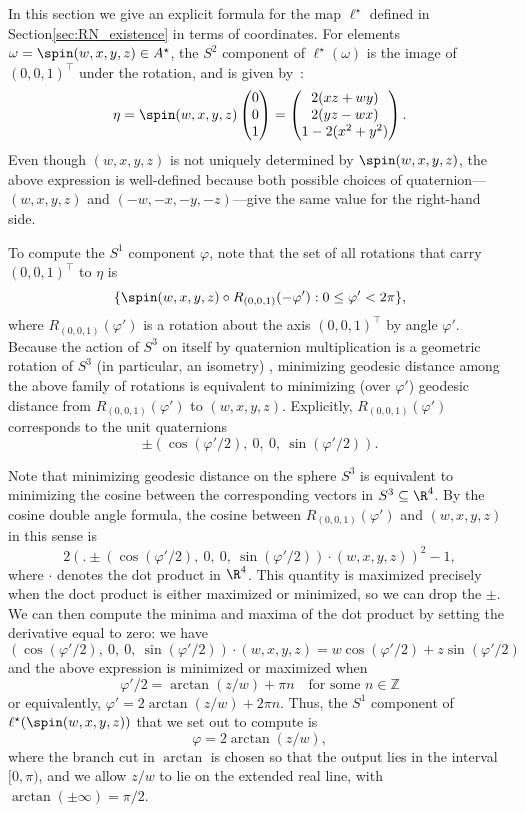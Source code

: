 In this section we give an explicit formula for the map $\ell^\star$ defined in Section\ref{sec:RN_existence} in terms of coordinates.
For elements $\omega = \spin(w, x, y, z) \in A^\star$, the $S^2$ component of $\ell^\star(\omega)$ is the image of $(0, 0, 1)^\top$ under the rotation, and is given by~\cite[\S8.2]{gallier2001quat}:
\[ \eta
    = \spin(w, x, y, z) \begin{pmatrix} 0 \\ 0 \\ 1 \end{pmatrix}
    = \begin{pmatrix}
        2(xz + wy) \\
        2(yz - wx) \\
        1 - 2(x^2 + y^2)
      \end{pmatrix}.
\]
Even though $(w,x,y,z)$ is not uniquely determined by $\spin(w,x,y,z)$, the above expression is well-defined because both possible choices of quaternion---$(w,x,y,z)$ and $(-w,-x,-y,-z)$---give the same value for the right-hand side.

To compute the $S^1$ component $\varphi$, note that the set of all rotations that carry $(0, 0, 1)^\top$ to $\eta$ is
\[ \{ \spin(w, x, y, z) \circ R_{(0,0,1)}(-\varphi') : 0 \leq \varphi' < 2\pi\}, \]
where $R_{(0,0,1)}(\varphi')$ is a rotation about the axis $(0, 0, 1)^\top$ by angle $\varphi'$.
Because the action of $S^3$ on itself by quaternion multiplication is a geometric rotation of $S^3$ (in particular, an isometry) \cite[\S8.3]{gallier2001quat}, minimizing geodesic distance among the above family of rotations is equivalent to minimizing (over $\varphi'$) geodesic distance from $R_{(0,0,1)}(\varphi')$ to $(w,x,y,z)$.
Explicitly, $R_{(0,0,1)}(\varphi')$ corresponds to the unit quaternions
\[ \pm \left( \cos(\varphi'/2),\ 0,\ 0,\ \sin(\varphi'/2) \right). \]

Note that minimizing geodesic distance on the sphere $S^3$ is equivalent to minimizing the cosine between the corresponding vectors in $S^3 \subseteq \R^4$.
By the cosine double angle formula, the cosine between $R_{(0,0,1)}(\varphi')$ and $(w,x,y,z)$ in this sense is
\[ 2 \left(\Big. \pm(\cos(\varphi'/2),\ 0,\ 0,\ \sin(\varphi'/2)) \cdot (w, x, y, z)\right)^2 - 1, \]
where $\cdot$ denotes the dot product in $\R^4$.
This quantity is maximized precisely when the doct product is either maximized or minimized, so we can drop the $\pm$.
We can then compute the minima and maxima of the dot product by setting the derivative equal to zero: we have
\[ 
    (\cos(\varphi'/2),\ 0,\ 0,\ \sin(\varphi'/2)) \cdot (w, x, y, z) = w \cos(\varphi'/2) + z \sin(\varphi'/2)
\]
and the above expression is minimized or maximized when
\[
    \varphi'/2 = \arctan(z/w) + \pi n \quad\text{for some $n \in \mathbb{Z}$}
\]
or equivalently, $\varphi' = 2\arctan(z/w) + 2\pi n$.
Thus, the $S^1$ component of $\ell^\star(\spin(w,x,y,z))$ that we set out to compute is
\[
    \varphi = 2\arctan(z/w),
\]
where the branch cut in $\arctan$ is chosen so that the output lies in the interval $[0, \pi)$, and we allow $z/w$ to lie on the extended real line, with $\arctan(\pm \infty) = \pi/2$.

